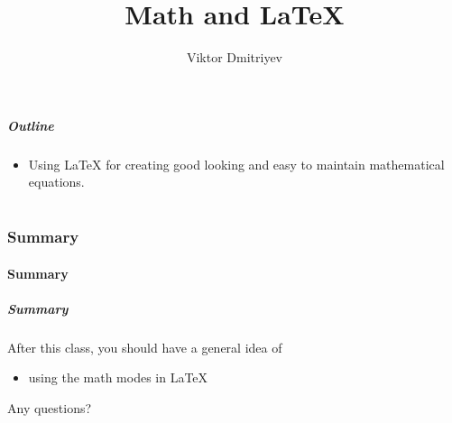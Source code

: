 \documentclass[slidestop,compress,mathserif]{beamer}
\title{Math and LaTeX}
\subtitle{}
\author{Viktor Dmitriyev}
\institute{Adapted from Mini Course on LaTeX by \href{https://github.com/OpenIntroOrg/mini-course-materials}{David Diez}}
\date{}
\begin{document}
\newenvironment{act}[1]{{\color{command}#1}}{}
\newcommand{\lcom}[1]{{\color{command}$\backslash$#1}}
\newcommand{\larg}[1]{{\color{braces}$\{${\color{black}#1}$\}$}}
\newcommand{\mathText}[1]{{\color{braces}\${\color{black}#1}\$}}


\frame{ \titlepage }

\begin{frame}
  \frametitle{Outline}
  \begin{itemize}
	  \item Using LaTeX for creating good looking and easy to maintain mathematical equations. 
  \end{itemize}
\end{frame}

\part{}



\section[Summary]{Summary}
\subsection[Summary]{Summary}

\begin{frame}  \frametitle{Summary}
After this class, you should have a general idea of
	\vspace{1mm} \\
		\begin{itemize}
			\item using the math modes in LaTeX
		\end{itemize}
	\vspace{1mm}

Any questions?
\end{frame}
\end{document}
